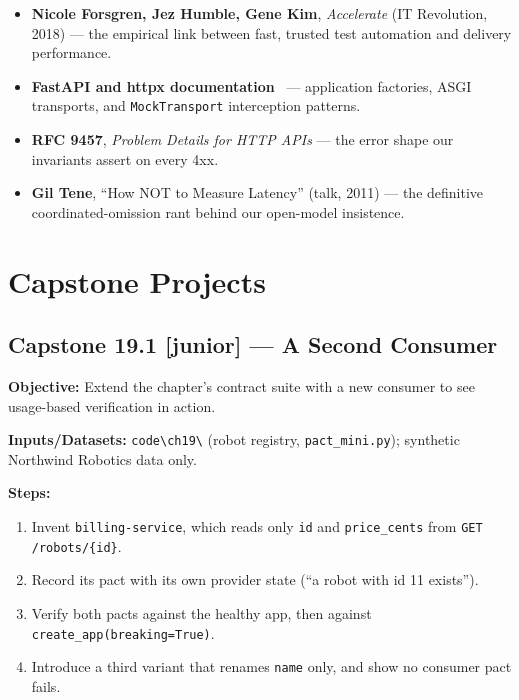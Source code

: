 \begin{itemize}
        partial failure, partitions, and why distributed systems need
        fault injection.
  \item \textbf{Nicole Forsgren, Jez Humble, Gene Kim},
        \emph{Accelerate} (IT Revolution, 2018) --- the empirical link
        between fast, trusted test automation and delivery performance.
  \item \textbf{FastAPI and httpx documentation}~\cite{fastapidocs,httpxdocs}
        --- application factories, ASGI transports, and
        \texttt{MockTransport} interception patterns.
  \item \textbf{RFC 9457}, \emph{Problem Details for HTTP APIs} --- the
        error shape our invariants assert on every 4xx.
  \item \textbf{Gil Tene}, ``How NOT to Measure Latency'' (talk, 2011) ---
        the definitive coordinated-omission rant behind our open-model
        insistence.
\end{itemize}

\section{Capstone Projects}
\label{sec:ch19-capstones}

\subsection*{Capstone 19.1 [junior] --- A Second Consumer}
\textbf{Objective:} Extend the chapter's contract suite with a new consumer
to see usage-based verification in action.

\textbf{Inputs/Datasets:} \texttt{code\textbackslash{}ch19\textbackslash{}}
(robot registry, \texttt{pact\_mini.py}); synthetic Northwind Robotics data
only.

\textbf{Steps:}
\begin{enumerate}
  \item Invent \texttt{billing-service}, which reads only \texttt{id} and
        \texttt{price\_cents} from \texttt{GET /robots/\{id\}}.
  \item Record its pact with its own provider state
        (``a robot with id 11 exists'').
  \item Verify both pacts against the healthy app, then against
        \texttt{create\_app(breaking=True)}.
  \item Introduce a third variant that renames \texttt{name} only, and show
        no consumer pact fails.
\end{enumerate}

